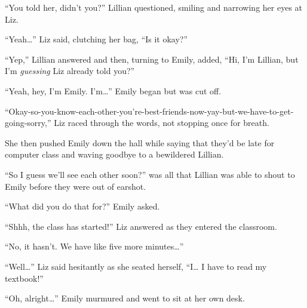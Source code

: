 “You told her, didn't you?” Lillian questioned, smiling and narrowing her eyes at Liz.

“Yeah…” Liz said, clutching her bag, “Is it okay?”

“Yep,” Lillian answered and then, turning to Emily, added, “Hi, I'm Lillian, but I'm \textit{guessing} Liz already told you?”

“Yeah, hey, I'm Emily. I'm…” Emily began but was cut off.

“Okay-so-you-know-each-other-you're-best-friends-now-yay-but-we-have-to-get-going-sorry,” Liz raced through the words, not stopping once for breath.

She then pushed Emily down the hall while saying that they'd be late for computer class and waving goodbye to a bewildered Lillian.

“So I guess we'll see each other soon?” was all that Lillian was able to shout to Emily before they were out of earshot.

“What did you do that for?” Emily asked.

“Shhh, the class has started!” Liz answered as they entered the classroom.

“No, it hasn't. We have like five more minutes…”

“Well…” Liz said hesitantly as she seated herself, “I… I have to read my textbook!”

“Oh, alright…” Emily murmured and went to sit at her own desk.